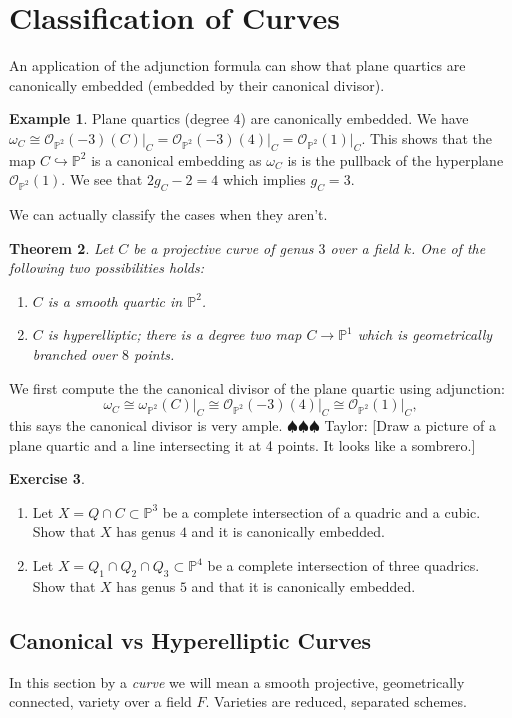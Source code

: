 \documentclass[12pt]{article}
\numberwithin{equation}{section}
\newtheorem{theorem}{Theorem}[subsection]
\theoremstyle{definition}
\newtheorem{example}[theorem]{Example}
\newtheorem{exercise}[theorem]{Exercise}
\theoremstyle{remark}
\newcommand{\Ocal}{\mathcal{O}}
\newcommand{\PP}{\mathbb{P}}
\newcommand{\taylor}[1]{{\color{blue} \sf $\spadesuit\spadesuit\spadesuit$ Taylor: [#1]}}
\begin{document}
\section{Classification of Curves}

An application of the adjunction formula can show that plane quartics are canonically embedded (embedded by their canonical divisor). 
\begin{example}
	Plane quartics (degree $4$) are canonically embedded.
	We have $\omega_C \cong \Ocal_{\PP^2}(-3)(C)\vert_C = \Ocal_{\PP^2}(-3)(4)\vert_C = \Ocal_{\PP^2}(1)\vert_C$. 
	This shows that the map $C \hookrightarrow \PP^2$ is a canonical embedding as $\omega_C$ is is the pullback of the hyperplane $\Ocal_{\PP^2}(1)$. 
	We see that $2g_C-2 = 4$ which implies $g_C=3$.
\end{example}
We can actually classify the cases when they aren't.
\begin{theorem}
	Let $C$ be a projective curve of genus $3$ over a field $k$.
	One of the following two possibilities holds:
	\begin{enumerate}
		\item $C$ is a smooth quartic in $\PP^2$.
		\item $C$ is hyperelliptic; there is a degree two map $C\to \PP^1$ which is geometrically branched over $8$ points.
	\end{enumerate}
\end{theorem}

We first compute the the canonical divisor of the plane quartic using adjunction:
$$\omega_C \cong \omega_{\PP^2}(C)\vert_C \cong \Ocal_{\PP^2}(-3)(4)\vert_C \cong \Ocal_{\PP^2}(1)\vert_C,$$
this says the canonical divisor is very ample.
\taylor{Draw a picture of a plane quartic and a line intersecting it at 4 points. 
It looks like a sombrero.}

\begin{exercise}
	\begin{enumerate}
		\item Let $X = Q\cap C \subset \PP^3$ be a complete intersection of a quadric and a cubic. Show that $X$ has genus $4$ and it is canonically embedded. 
		\item Let $X = Q_1 \cap Q_2 \cap Q_3 \subset \PP^4$ be a complete intersection of three quadrics. Show that $X$ has genus $5$ and that it is canonically embedded. 
	\end{enumerate}
\end{exercise}

\subsection{Canonical vs Hyperelliptic Curves}
In this section by a \emph{curve} we will mean a smooth projective, geometrically connected, variety over a field $F$. 
Varieties are reduced, separated schemes. 
\end{document}
